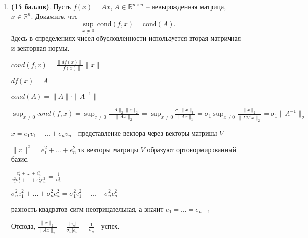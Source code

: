 \documentclass[a4paper, 11pt]{article}
\newcommand{\prob}[1]{\item \textbf{(#1 баллов)}.}
\begin{document}
\begin{enumerate}
			тогда прямая устойчивость $\leqslant \epsilon_{machine} \frac{\| x \| + (2n + 4) |u^T| |x| \| u \|}{\| x - 2(u^T x) u\|} + O(\epsilon^2_{machine}) = O(\epsilon_{machine})$
			
			Обратная:
			
			$\exists \tilde{x} : \tilde{f}(x) = f(\tilde{x}) : \frac{\| \tilde{x} - x\|}{\|x\|} = O(\epsilon_{machine})$
			
			$\displaystyle fl(x - 2(u^T x)u) = (1 + \epsilon) (x - 2(\sum_{j = 1}^{n} u_j x_j (1 + \epsilon)^{n - i + 2}))u \cdot (1 + \epsilon)^{n + 1} = (1 + \epsilon)x - (1 + \epsilon) 2 (\sum_{j =1}^{n} u_i x_i (1 + \epsilon)^{n - i + 2})u (1 + \epsilon)^{n + 1} = \tilde{x} - 2(\sum_{i = 1}^{n} \tilde{x}_i u_i (1 + \epsilon^{n - i + 2}))u (1 + \epsilon)^{n + 1}$			
			
			Обратной устойчивости тут не будет тк вектор не получается возмутить.
			
		
		\prob{15}
		Пусть $f(x) = Ax$, $A\in\mathbb{R}^{n\times n}$ -- невырожденная матрица, $x\in\mathbb{R}^n$. 
		Докажите, что 
		\[
		\sup_{x\not=0} \ \mathrm{cond}(f,x) = \mathrm{cond} (A).
		\]
		Здесь в определениях чисел обусловленности используется вторая матричная и векторная нормы.
		
			$cond(f, x) = \frac{\|df(x)\|}{\|f(x)\|} \|x\| $
			
			$df(x) = A$
			
			$cond(A) = \|A\| \cdot \|A^{-1}\|$
			
			$\displaystyle \sup_{x\not=0} cond(f, x) = \sup_{x\not=0} \frac{\|A\|_2 \|x\|_2}{\|Ax\|_2} = \sup_{x\not=0} \frac{\sigma_1 \|x\|_2}{\|Ax\|_2} = \sigma_1 \sup_{x\not=0} \frac{\|x\|_2}{\|\Sigma V^T x\|_2} = \sigma_1 \|A^{-1}\|_2 $
			
			$\displaystyle x = e_1 v_1 + \dots + e_n v_n$ - представление вектора через векторы матрицы $V$
			
			$\|x\|^2 = e_1^2 + \dots + e_n^2 $ тк векторы матрицы $V$ образуют ортонормированный базис.
			
			$\displaystyle \frac{e_1^2 + \dots + e_n^2}{e_1^2 \sigma_1^2 + \dots + \sigma_n^2 e_n^2} = \frac{1}{\sigma_n^2}$
			
			$\sigma_n^2 e_1^2 + \dots + \sigma_n^2 e_n^2 = \sigma_1^2 e_1^2 + \dots + \sigma_n^2 e_n^2$
			
			разность квадратов сигм неотрицательная, а значит $e_1 = \dots = e_{n - 1} $
			
			Отсюда, $\frac{\|x\|_2}{\| Ax \|_2} = \frac{|e_n|}{\sigma_n |e_n|} = \frac{1}{\sigma_n}$ - успех. 
		

\end{enumerate}
\end{document}
